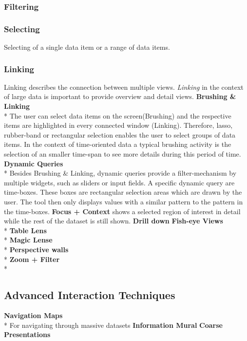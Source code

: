 \subsubsection*{Filtering}

\subsubsection*{Selecting}
Selecting of a single data item or a range of data items.
\subsubsection*{Linking}
Linking describes the connection between multiple views. \textit{Linking} in the context of large data is important to provide overview and detail views. 
\textbf{Brushing \& Linking}\\*
The user can select data items on the screen(Brushing) and the respective items are highlighted in every connected window (Linking). Therefore, lasso, rubber-band or rectangular selection enables the user to select groups of data items\cite{tegarden1999, Aigner2011}. In the context of time-oriented data a typical brushing activity is the selection of an smaller time-span to see more details during this period of time.
\textbf{Dynamic Queries}\\*
Besides Brushing \& Linking, dynamic queries provide a filter-mechanism by multiple widgets, such as sliders or input fields\cite{Hochheiser2004,Shneiderman2008,Aigner2011}. A specific dynamic query are time-boxes. These boxes are rectangular selection areas which are drawn by the user. The tool then only displays values with a similar pattern to the pattern in the time-boxes.
\textbf{Focus + Context} shows a selected region of interest in detail while the rest of the dataset is still shown\cite{Keim2005}. 
\textbf{Drill down}
\textbf{Fish-eye Views}\\*
\textbf{Table Lens}\\*
\textbf{Magic Lense}\\*
\textbf{Perspective walls\cite{Keim2005}}\\*
\textbf{Zoom + Filter}\\*



\subsection{Advanced Interaction Techniques}
\textbf{Navigation Maps}\\*
For navigating through massive datasets 
\textbf{Information Mural}
\textbf{Coarse Presentations}

